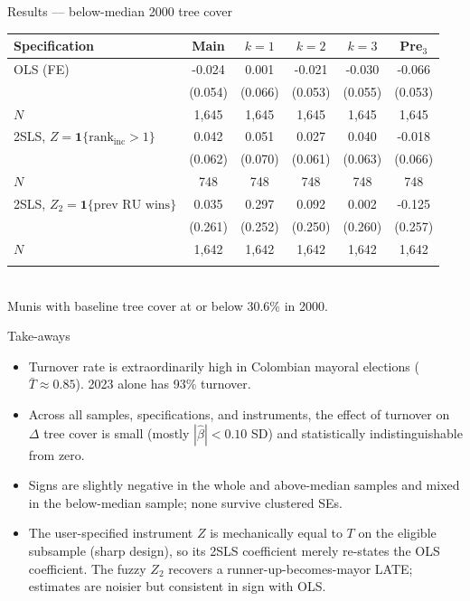 \documentclass[10pt,aspectratio=169]{beamer}
\begin{document}
\begin{frame}{Results — below-median 2000 tree cover}
\centering
\renewcommand{\arraystretch}{1.15}\footnotesize
\begin{tabular}{lccccc}
\toprule
Specification & Main & $k{=}1$ & $k{=}2$ & $k{=}3$ & Pre$_3$ \\
\midrule
OLS (FE) & -0.024 & 0.001 & -0.021 & -0.030 & -0.066 \\
 & (0.054) & (0.066) & (0.053) & (0.055) & (0.053) \\
$N$ & 1,645 & 1,645 & 1,645 & 1,645 & 1,645 \\
\addlinespace[2pt]
2SLS, $Z=\mathbf{1}\{\text{rank}_\text{inc}{>}1\}$ & 0.042 & 0.051 & 0.027 & 0.040 & -0.018 \\
 & (0.062) & (0.070) & (0.061) & (0.063) & (0.066) \\
$N$ & 748 & 748 & 748 & 748 & 748 \\
\addlinespace[2pt]
2SLS, $Z_2=\mathbf{1}\{\text{prev RU wins}\}$ & 0.035 & 0.297 & 0.092 & 0.002 & -0.125 \\
 & (0.261) & (0.252) & (0.250) & (0.260) & (0.257) \\
$N$ & 1,642 & 1,642 & 1,642 & 1,642 & 1,642 \\
\addlinespace[2pt]
\bottomrule
\end{tabular}
\\[0.3em]
\footnotesize Munis with baseline tree cover at or below 30.6\% in 2000.
\end{frame}


\begin{frame}{Take-aways}
\begin{itemize}
  \item Turnover rate is extraordinarily high in Colombian mayoral elections
        (\textbf{$\bar T \approx 0.85$}). 2023 alone has 93\% turnover.
  \item Across all samples, specifications, and instruments, the effect of
        turnover on $\Delta$ tree cover is small (mostly $|\hat\beta|<0.10$ SD)
        and statistically indistinguishable from zero.
  \item Signs are slightly negative in the whole and above-median samples
        and mixed in the below-median sample; none survive clustered SEs.
  \item The user-specified instrument $Z$ is mechanically equal to $T$
        on the eligible subsample (sharp design), so its 2SLS coefficient
        merely re-states the OLS coefficient. The fuzzy $Z_2$ recovers a
        runner-up-becomes-mayor LATE; estimates are noisier but consistent
        in sign with OLS.
\end{itemize}
\end{frame}
\end{document}
